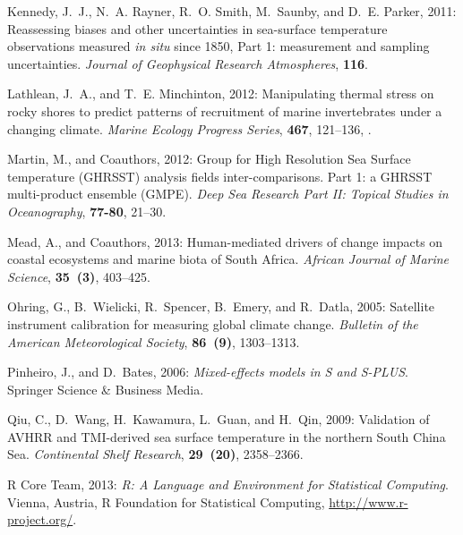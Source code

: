 \documentclass[]{ametsoc}
\begin{document}
\begin{thebibliography}{41}
Kennedy, J.~J., N.~A. Rayner, R.~O. Smith, M.~Saunby, and D.~E. Parker, 2011:
  {Reassessing biases and other uncertainties in sea-surface temperature
  observations measured \emph{in situ} since 1850, Part 1: measurement and
  sampling uncertainties}. \textit{Journal of Geophysical Research
  Atmospheres}, \textbf{116}.

Lathlean, J.~A., and T.~E. Minchinton, 2012: {Manipulating thermal stress on
  rocky shores to predict patterns of recruitment of marine invertebrates under
  a changing climate}. \textit{Marine Ecology Progress Series}, \textbf{467},
  121--136, .

Martin, M., and Coauthors, 2012: {Group for High Resolution Sea Surface
  temperature (GHRSST) analysis fields inter-comparisons. Part 1: a GHRSST
  multi-product ensemble (GMPE)}. \textit{Deep Sea Research Part II: Topical
  Studies in Oceanography}, \textbf{77-80}, 21--30.

Mead, A., and Coauthors, 2013: {Human-mediated drivers of change {\textemdash}
  impacts on coastal ecosystems and marine biota of South Africa}.
  \textit{African Journal of Marine Science}, \textbf{35~(3)}, 403--425.

Ohring, G., B.~Wielicki, R.~Spencer, B.~Emery, and R.~Datla, 2005: {Satellite
  instrument calibration for measuring global climate change}. \textit{Bulletin of the American Meteorological Society},
  \textbf{86~(9)}, 1303--1313.

Pinheiro, J., and D.~Bates, 2006: \textit{Mixed-effects models in S and
  S-PLUS}. Springer Science \& Business Media.

Qiu, C., D.~Wang, H.~Kawamura, L.~Guan, and H.~Qin, 2009: {Validation of AVHRR
  and TMI-derived sea surface temperature in the northern South China Sea}.
  \textit{Continental Shelf Research}, \textbf{29~(20)}, 2358--2366.

{R Core Team}, 2013: \textit{{R: A Language and Environment for Statistical
  Computing}}. Vienna, Austria, R Foundation for Statistical Computing,
  \urlprefix\url{http://www.r-project.org/}.


\end{thebibliography}
\end{document}
